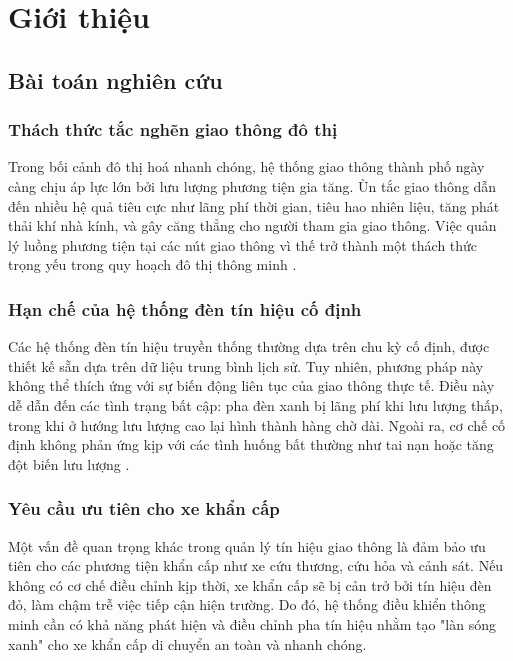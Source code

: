 \chapter{Giới thiệu}

\section{Bài toán nghiên cứu}
\subsection{Thách thức tắc nghẽn giao thông đô thị}
Trong bối cảnh đô thị hoá nhanh chóng, hệ thống giao thông thành phố
 ngày càng chịu áp lực lớn bởi lưu lượng phương tiện gia tăng. Ùn tắc giao
 thông dẫn đến nhiều hệ quả tiêu cực như lãng phí thời gian, tiêu hao nhiên
 liệu, tăng phát thải khí nhà kính, và gây căng thẳng cho người tham gia
 giao thông. Việc quản lý luồng phương tiện tại các nút giao thông vì thế trở
 thành một thách thức trọng yếu trong quy hoạch đô thị thông minh \cite{Eom2020}.

\subsection{Hạn chế của hệ thống đèn tín hiệu cố định}
 Các hệ thống đèn tín hiệu truyền thống thường dựa trên chu kỳ cố định,
 được thiết kế sẵn dựa trên dữ liệu trung bình lịch sử. Tuy nhiên, phương
 pháp này không thể thích ứng với sự biến động liên tục của giao thông thực
 tế. Điều này dễ dẫn đến các tình trạng bất cập: pha đèn xanh bị lãng phí khi
 lưu lượng thấp, trong khi ở hướng lưu lượng cao lại hình thành hàng chờ dài.
 Ngoài ra, cơ chế cố định không phản ứng kịp với các tình huống bất thường
 như tai nạn hoặc tăng đột biến lưu lượng \cite{Eom2020}.

\subsection{Yêu cầu ưu tiên cho xe khẩn cấp}
Một vấn đề quan trọng khác trong quản lý tín hiệu giao thông là đảm bảo ưu
 tiên cho các phương tiện khẩn cấp như xe cứu thương, cứu hỏa và cảnh sát.
 Nếu không có cơ chế điều chỉnh kịp thời, xe khẩn cấp sẽ bị cản trở bởi tín
 hiệu đèn đỏ, làm chậm trễ việc tiếp cận hiện trường. Do đó, hệ thống điều
khiển thông minh cần có khả năng phát hiện và điều chỉnh pha tín hiệu nhằm
 tạo "làn sóng xanh" cho xe khẩn cấp di chuyển an toàn và nhanh chóng.

